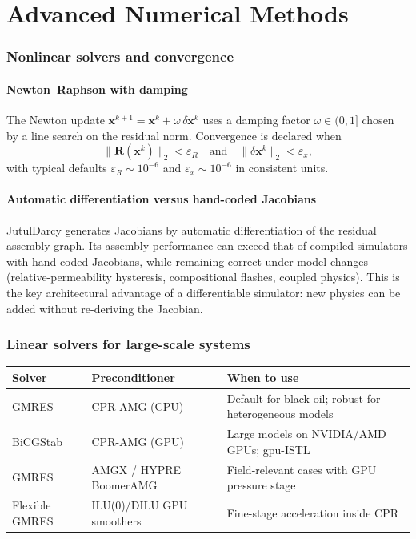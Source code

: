 \documentclass[10pt,a4paper]{article}
\begin{document}
\part{Advanced Numerical Methods}

\section{Nonlinear solvers and convergence}

\subsection{Newton--Raphson with damping}

The Newton update $\bm{x}^{k+1}=\bm{x}^{k}+\omega\,\delta\bm{x}^{k}$ uses a
damping factor $\omega\in(0,1]$ chosen by a line search on the residual norm.
Convergence is declared when
\begin{equation}
  \|\bm{R}(\bm{x}^{k})\|_2 < \varepsilon_R
  \quad\text{and}\quad
  \|\delta\bm{x}^{k}\|_2 < \varepsilon_x,
  \label{eq:newton-conv}
\end{equation}
with typical defaults $\varepsilon_R\sim10^{-6}$ and $\varepsilon_x\sim10^{-6}$
in consistent units.

\subsection{Automatic differentiation versus hand-coded Jacobians}

JutulDarcy generates Jacobians by automatic differentiation of the residual
assembly graph. Its assembly performance can exceed that of compiled simulators
with hand-coded Jacobians, while remaining correct under model changes
(relative-permeability hysteresis, compositional flashes, coupled physics).
This is the key architectural advantage of a differentiable simulator: new
physics can be added without re-deriving the Jacobian.

\section{Linear solvers for large-scale systems}

\begin{longtable}{@{}p{3.2cm}p{4.4cm}p{6.2cm}@{}}
\toprule
\textbf{Solver} & \textbf{Preconditioner} & \textbf{When to use}\\
\midrule
\endhead
GMRES & CPR-AMG (CPU) & Default for black-oil; robust for heterogeneous models\\
BiCGStab & CPR-AMG (GPU) & Large models on NVIDIA/AMD GPUs; gpu-ISTL\\
GMRES & AMGX / HYPRE BoomerAMG & Field-relevant cases with GPU pressure stage\\
Flexible GMRES & ILU(0)/DILU GPU smoothers & Fine-stage acceleration inside CPR\\
\bottomrule
\end{longtable}
\end{document}
